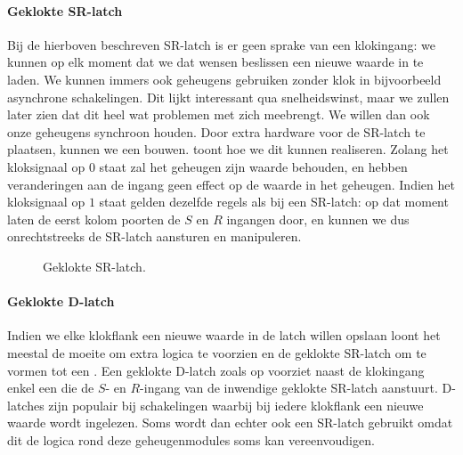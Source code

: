 \paragraph{Geklokte SR-latch}
Bij de hierboven beschreven SR-latch is er geen sprake van een klokingang: we kunnen op elk moment dat we dat wensen beslissen een nieuwe waarde in te laden. We kunnen immers ook geheugens gebruiken zonder klok in bijvoorbeeld asynchrone schakelingen. Dit lijkt interessant qua snelheidswinst, maar we zullen later zien dat dit heel wat problemen met zich meebrengt. We willen dan ook onze geheugens synchroon houden. Door extra hardware voor de SR-latch te plaatsen, kunnen we een  bouwen.  toont hoe we dit kunnen realiseren. Zolang het kloksignaal op $0$ staat zal het geheugen zijn waarde behouden, en hebben veranderingen aan de ingang geen effect op de waarde in het geheugen. Indien het kloksignaal op $1$ staat gelden dezelfde regels als bij een SR-latch: op dat moment laten de eerst kolom poorten de $S$ en $R$ ingangen door, en kunnen we dus onrechtstreeks de SR-latch aansturen en manipuleren.

\begin{figure}[hbt]
\centering
{}
\caption{Geklokte SR-latch.}
\end{figure}

\paragraph{Geklokte D-latch}
Indien we elke klokflank een nieuwe waarde in de latch willen opslaan loont het meestal de moeite om extra logica te voorzien en de geklokte SR-latch om te vormen tot een . Een geklokte D-latch zoals op  voorziet naast de klokingang enkel een  die de $S$- en $R$-ingang van de inwendige geklokte SR-latch aanstuurt. D-latches zijn populair bij schakelingen waarbij bij iedere klokflank een nieuwe waarde wordt ingelezen. Soms wordt dan echter ook een SR-latch gebruikt omdat dit de logica rond deze geheugenmodules soms kan vereenvoudigen.

